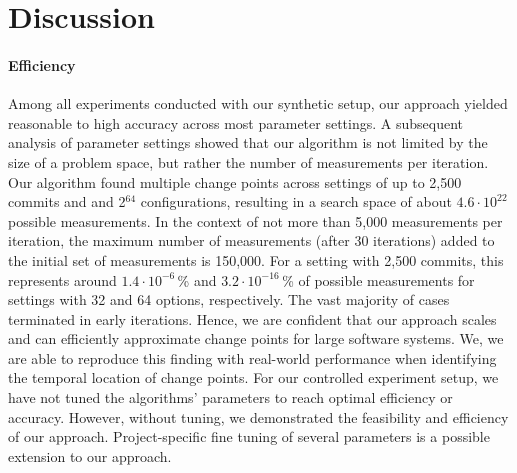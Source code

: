 \documentclass[sigconf]{acmart}
\begin{document}
	\section{Discussion}
	\paragraph{Efficiency} Among all experiments conducted with our synthetic setup, our approach yielded reasonable to high accuracy across most parameter settings. A subsequent analysis of parameter settings showed that our algorithm is not limited by the size of a problem space, but rather the number of measurements per iteration. Our algorithm found multiple change points across settings of up to 2,500 commits and and 2$^{64}$ configurations, resulting in a search space of about $4.6 \cdot 10^{22}$ possible measurements.
	In the context of not more than 5,000 measurements per iteration, the maximum number of measurements (after 30 iterations) added to the initial set of measurements is 150,000. For a setting with 2,500 commits, this represents around $1.4 \cdot 10^{-6}$\,\% and $3.2\cdot 10^{-16}$\,\% of possible measurements for settings with 32 and 64 options, respectively. The vast majority of cases terminated in early iterations. Hence, we are confident that our approach scales and can efficiently approximate change points for large software systems. We, we are able to reproduce this finding with real-world performance when identifying the temporal location of change points. {\color{red}For our controlled experiment setup, we have not tuned the algorithms’ parameters to reach optimal efficiency or accuracy. However, without tuning, we demonstrated the feasibility and efficiency of our approach. Project-specific fine tuning of several parameters is a possible extension to our approach.}
	
\end{document}
